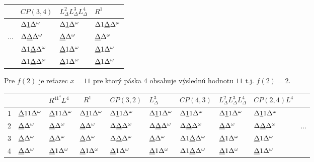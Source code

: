 \documentclass[11pt,a4paper]{article}
\newcommand{\D}{\Delta}
\newcommand{\EOT}{\Delta^\omega} %
\newcommand{\UL}[1]{\underbar{$#1$}} %
\begin{document}
\begin{flushright}
  \begin{tabular}{r|l|l|l}
        &\tiny{$CP(3,4)$}    & \tiny{$L^2_\D L^3_\D L^4_\D$} & \tiny{$R^1$}        \\\hline
        &$\D \UL{1} \EOT$    & $\D \UL{1} \EOT$              & $\D 1 \UL{\D} \EOT$ \\
    ... &$\D \UL{\D} \EOT$   & $\UL{\D} \EOT$                & $\UL{\D} \EOT$      \\
        &$\D 1 \UL{\D} \EOT$ & $\UL{\D} 1 \EOT$              & $\UL{\D} 1 \EOT$    \\
        &$\D 1 \UL{\D} \EOT$ & $\UL{\D} 1 \EOT$              & $\UL{\D} 1 \EOT$    \\
  \end{tabular}
\end{flushright}

Pre $f(2)$ je reťazec $x = 11$ pre ktorý páska 4 obsahuje výslednú hodnotu $11$ t.j. $f(2)=2$.\\[-0.5em]

\begin{tabular}{r|l|l|l|l|l|l|l|l|l}
    &                    &\tiny{$R^41^4L^4$}  & \tiny{$R^1$}       & \tiny{$CP(3,2)$}   & \tiny{$L^3_\D$}    & \tiny{$CP(4,3)$}    &\tiny{$L^2_\D L^3_\D L^4_\D$}& \tiny{$CP(2,4)L^4$} & \\\hline
  1 & $\UL{\D} 1 1 \EOT$ & $\UL{\D} 1 1 \EOT$ & $\D \UL{1} 1 \EOT$ & $\D \UL{1} 1 \EOT$ & $\D \UL{1} 1 \EOT$ & $\D \UL{1} 1 \EOT$  & $\D \UL{1} 1 \EOT$          & $\D \UL{1} 1 \EOT$  & \\
  2 & $\UL{\D} \EOT$     & $\UL{\D} \EOT$     & $\UL{\D} \EOT$     & $\D \UL{\D} \EOT$  & $\D \UL{\D} \EOT$  & $\D \UL{\D} \EOT$   & $\UL{\D} \EOT$              & $\D \UL{\D} \EOT$   & ... \\
  3 & $\UL{\D} \EOT$     & $\UL{\D} \EOT$     & $\UL{\D} \EOT$     & $\D \UL{\D} \EOT$  & $\UL{\D} \EOT$     & $\D 1 \UL{\D} \EOT$ & $\UL{\D} 1 \EOT$            & $\UL{\D} 1 \EOT$    & \\
  4 & $\UL{\D} \EOT$     & $\UL{\D} 1 \EOT$   & $\UL{\D} 1 \EOT$   & $\UL{\D} 1 \EOT$   & $\UL{\D} 1 \EOT$   & $\D 1 \UL{\D} \EOT$ & $\UL{\D} 1 \EOT$            & $\UL{\D} 1 \EOT$    & \\
\end{tabular}
\end{document}
